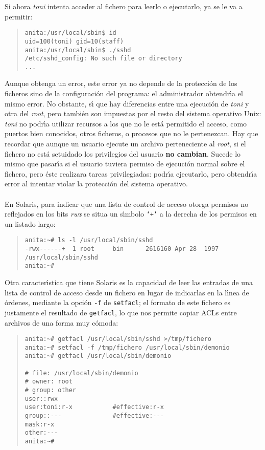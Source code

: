 Si ahora {\it toni} intenta acceder al fichero para leerlo o ejecutarlo, ya
se le va a permitir:
\begin{quote}
\begin{verbatim}
anita:/usr/local/sbin$ id
uid=100(toni) gid=10(staff)
anita:/usr/local/sbin$ ./sshd
/etc/sshd_config: No such file or directory
...
\end{verbatim}
\end{quote}
Aunque obtenga un error, este error ya no depende de
la protecci\'on de los ficheros sino de la configuraci\'on del programa: el
administrador obtendr\'{\i}a el mismo error. No obstante, s\'{\i} que hay 
diferencias entre una ejecuci\'on de {\it toni} y otra del {\it root}, pero 
tambi\'en son impuestas por el resto del sistema operativo Unix: {\it toni} no
podr\'{\i}a utilizar recursos a los que no le est\'a permitido el acceso, como
puertos bien conocidos, otros ficheros, o procesos que no le pertenezcan. Hay
que recordar que aunque un usuario ejecute un archivo perteneciente al {\it
root}, si el fichero no est\'a setuidado los privilegios del usuario {\bf no
cambian}. Sucede lo mismo que pasar\'{\i}a si el usuario tuviera permiso de
ejecuci\'on normal sobre el fichero, pero \'este realizara tareas privilegiadas:
podr\'{\i}a ejecutarlo, pero obtendr\'{\i}a error al intentar violar la
protecci\'on del sistema operativo.\\
\\En Solaris, para indicar que una lista de control de acceso otorga permisos
no reflejados en los bits {\it rwx} se situa un s\'{\i}mbolo {\tt `+'} a la
derecha de los permisos en un listado largo:
\begin{quote}
\begin{verbatim}
anita:~# ls -l /usr/local/sbin/sshd
-rwx------+  1 root     bin      2616160 Apr 28  1997 /usr/local/sbin/sshd
anita:~# 
\end{verbatim}
\end{quote}
Otra caracter\'{\i}stica que tiene Solaris es la capacidad de leer las 
entradas de una lista de control de acceso desde un fichero en lugar de
indicarlas en la l\'{\i}nea de \'ordenes, mediante la opci\'on {\tt -f} de
{\tt setfacl}; el formato de este fichero es 
justamente el resultado de {\tt getfacl}, lo que nos permite copiar ACLs entre
archivos de una forma muy c\'omoda:
\begin{quote}
\begin{verbatim}
anita:~# getfacl /usr/local/sbin/sshd >/tmp/fichero
anita:~# setfacl -f /tmp/fichero /usr/local/sbin/demonio
anita:~# getfacl /usr/local/sbin/demonio

# file: /usr/local/sbin/demonio
# owner: root
# group: other
user::rwx
user:toni:r-x           #effective:r-x
group::---              #effective:---
mask:r-x
other:---
anita:~#
\end{verbatim}
\end{quote}

